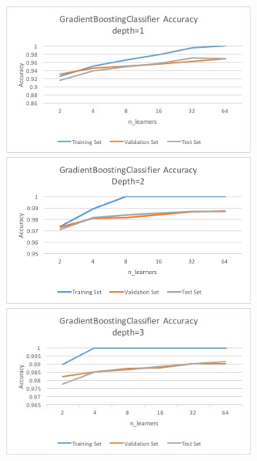 \documentclass[11pt, oneside]{article}   	%
\begin{document}
\includegraphics[width=8cm]{gradientBoost1} 
\includegraphics[width=8cm]{gradientBoost2} 
\includegraphics[width=8cm]{gradientBoost3}
\end{document}
